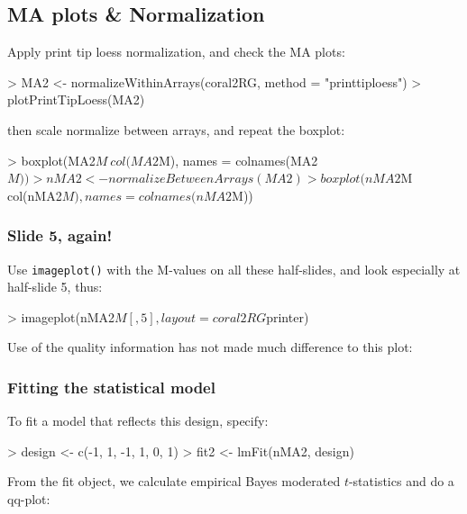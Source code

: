 \documentclass[a4paper,9pt]{article}
\begin{document}
\subsection{MA plots \& Normalization}
Apply print tip loess normalization, and check the MA plots:
\begin{Schunk}
\begin{Sinput}
> MA2 <- normalizeWithinArrays(coral2RG, method = "printtiploess")
> plotPrintTipLoess(MA2)
\end{Sinput}
\end{Schunk}
then scale normalize between arrays, and repeat the boxplot:
\begin{Schunk}
\begin{Sinput}
> boxplot(MA2$M ~ col(MA2$M), names = colnames(MA2$M))
> nMA2 <- normalizeBetweenArrays(MA2)
> boxplot(nMA2$M ~ col(nMA2$M), names = colnames(nMA2$M))
\end{Sinput}
\end{Schunk}

\subsubsection*{Slide 5, again!}
Use \texttt{imageplot()} with the M-values on all these half-slides, and look
especially at half-slide 5, thus:
\begin{Schunk}
\begin{Sinput}
> imageplot(nMA2$M[, 5], layout = coral2RG$printer)
\end{Sinput}
\end{Schunk}
Use of the quality information has not made much difference to this plot:

\subsubsection*{Fitting the statistical model}
To fit a model that reflects this design, specify:
\begin{Schunk}
\begin{Sinput}
> design <- c(-1, 1, -1, 1, 0, 1)
> fit2 <- lmFit(nMA2, design)
\end{Sinput}
\end{Schunk}

From the fit object, we calculate empirical Bayes moderated 
$t$-statistics and do a qq-plot:
\begin{Schunk}
\end{Schunk}
\end{document}
